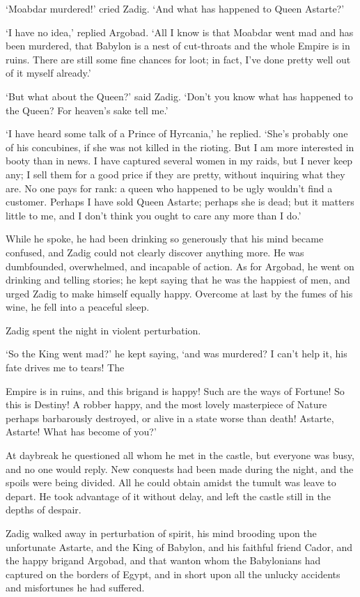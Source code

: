 \documentclass{article}
\begin{document}
\begin{center}
`Moabdar murdered!' cried Zadig. `And what has happened to Queen Astarte?' 

`I have no idea,' replied Argobad. `All I know is that Moabdar went mad and has 
been murdered, that Babylon is a nest of cut-throats and the whole Empire is in 
ruins. There are still some fine chances for loot; in fact, I've done pretty well 
out of it myself already.' 

`But what about the Queen?' said Zadig. `Don't you know what has happened to the 
Queen? For heaven's sake tell me.' 

`I have heard some talk of a Prince of Hyrcania,' he replied. `She's probably one 
of his concubines, if she was not killed in the rioting. But I am more interested 
in booty than in news. I have captured several women in my raids, but I never keep 
any; I sell them for a good price if they are pretty, without inquiring what they 
are. No one pays for rank: a queen who happened to be ugly wouldn't find a customer. 
Perhaps I have sold Queen Astarte; perhaps she is dead; but it matters little to 
me, and I don't think you ought to care any more than I do.' 

While he spoke, he had been drinking so generously that his mind became confused, 
and Zadig could not clearly discover anything more. He was dumbfounded, overwhelmed, 
and incapable of action. As for Argobad, he went on drinking and telling stories; 
he kept saying that he was the happiest of men, and urged Zadig to make himself 
equally happy. Overcome at last by the fumes of his wine, he fell into a peaceful 
sleep. 

Zadig spent the night in violent perturbation. 

`So the King went mad?' he kept saying, `and was murdered? I can't help it, his 
fate drives me to tears! The 

Empire is in ruins, and this brigand is happy! Such are the ways of Fortune! So 
this is Destiny! A robber happy, and the most lovely masterpiece of Nature perhaps 
barbarously destroyed, or alive in a state worse than death! Astarte, Astarte! 
What has become of you?' 

At daybreak he questioned all whom he met in the castle, but everyone was busy, 
and no one would reply. New conquests had been made during the night, and the spoils 
were being divided. All he could obtain amidst the tumult was leave to depart. 
He took advantage of it without delay, and left the castle still in the depths 
of despair. 

Zadig walked away in perturbation of spirit, his mind brooding upon the unfortunate 
Astarte, and the King of Babylon, and his faithful friend Cador, and the happy 
brigand Argobad, and that wanton whom the Babylonians had captured on the borders 
of Egypt, and in short upon all the unlucky accidents and misfortunes he had suffered.\pagebreak{} 


\end{center}
\end{document}
